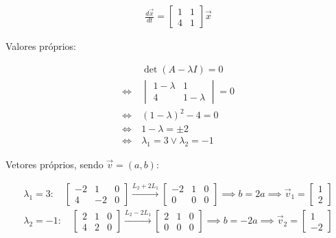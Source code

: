 \documentclass{article}
\begin{document}
\begin{gather*}
\frac{d\vec{x}}{dt} =
\begin{bmatrix}
1 & 1 \\
4 & 1
\end{bmatrix}
\vec{x}
\end{gather*}

Valores próprios:

\begin{align*}
& \det(A - \lambda I) = 0 \\
\Leftrightarrow \ &
\begin{vmatrix}
1 - \lambda & 1 \\
4 & 1 - \lambda
\end{vmatrix}
= 0 \\
\Leftrightarrow \ & (1 - \lambda)^2 - 4 = 0 \\
\Leftrightarrow \ & 1 - \lambda = \pm 2 \\
\Leftrightarrow \ & \lambda_1 = 3 \lor \lambda_2 = -1
\end{align*}

Vetores próprios, sendo $\vec{v} = (a, b)$:

\begin{gather*}
\lambda_1 = 3: \quad
\left[ \begin{array}{cc|c}
-2 & 1 & 0 \\
4 & -2 & 0
\end{array} \right]
\xrightarrow{L_2 + 2L_1}
\left[ \begin{array}{cc|c}
-2 & 1 & 0 \\
0 & 0 & 0
\end{array} \right]
\implies b = 2a
\implies \vec{v}_1 =
\begin{bmatrix}
1 \\
2
\end{bmatrix}
\\[1ex]
\lambda_2 = -1: \quad
\left[ \begin{array}{cc|c}
2 & 1 & 0 \\
4 & 2 & 0
\end{array} \right]
\xrightarrow{L_2 - 2L_1}
\left[ \begin{array}{cc|c}
2 & 1 & 0 \\
0 & 0 & 0
\end{array} \right]
\implies b = -2a
\implies \vec{v}_2 =
\begin{bmatrix}
1 \\
-2
\end{bmatrix}
\end{gather*}
\end{document}
